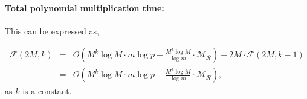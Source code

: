\documentclass[11pt]{article}
\begin{document}
\paragraph{Total polynomial multiplication time:}
This can be expressed as,


\begin{eqnarray} \label{eqn_FFT_complexity}
\mathcal{F}(2M, k) &=& O\left(M^k \log M \cdot m \log p + \frac{M^k \log M}{\log m} \cdot \mathcal{M}_{\mathcal{R}}\right) + 2M \cdot \mathcal{F}(2M, k-1) \nonumber \\
&=& O\left(M^k \log M \cdot m \log p + \frac{M^k \log M}{\log m} \cdot \mathcal{M}_{\mathcal{R}}\right),
\end{eqnarray}
as $k$ is a constant. \\

\end{document}
